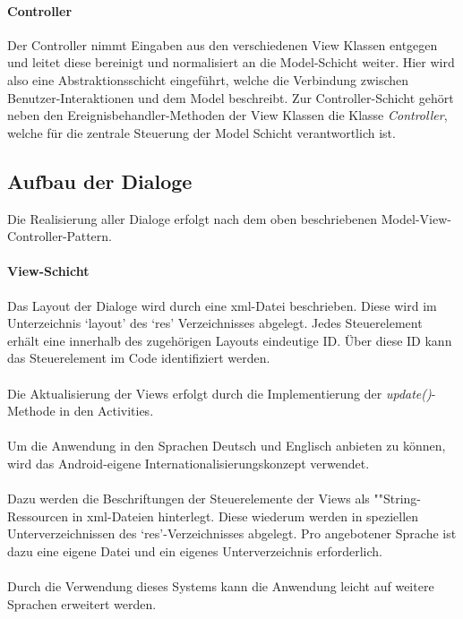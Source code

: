 \documentclass[10pt,a4paper]{article}
\begin{document}
  			\paragraph*{Controller}
  				Der Controller nimmt Eingaben aus den verschiedenen View Klassen entgegen und leitet diese bereinigt und normalisiert an die
  				Model-Schicht weiter. Hier wird also eine Abstraktionsschicht eingeführt, welche die Verbindung zwischen Benutzer-Interaktionen
  				und dem Model beschreibt. Zur Controller-Schicht gehört neben den Ereignisbehandler-Methoden der View Klassen die Klasse
  				\textit{Controller}, welche für die zentrale Steuerung der Model Schicht verantwortlich ist.  				
		\subsection{Aufbau der Dialoge}
  		\label{sec:aufbau_dialoge}
	Die Realisierung aller Dialoge erfolgt nach dem oben beschriebenen Model-View-Controller-Pattern.
	
		\paragraph*{View-Schicht} Das Layout der Dialoge wird durch eine xml-Datei beschrieben. Diese wird im Unterzeichnis `layout' des `res'
		Verzeichnisses abgelegt. Jedes Steuerelement erhält eine innerhalb des zugehörigen Layouts eindeutige ID. Über diese ID kann das Steuerelement
		im Code identifiziert werden. \\ \\
		Die Aktualisierung der Views erfolgt durch die Implementierung der \textit{update()}-Methode in den Activities. \\ \\
		Um die Anwendung in den Sprachen Deutsch und Englisch anbieten zu können, wird das Android-eigene Internationalisierungskonzept verwendet. \\ \\
		Dazu werden die Beschriftungen der Steuerelemente der Views als ""String-Res\-sour\-cen in xml-Dateien hinterlegt. Diese wiederum werden in
		speziellen Unterverzeichnissen des `res'-Verzeichnisses abgelegt. Pro angebotener Sprache ist dazu eine eigene Datei und ein eigenes
		Unterverzeichnis erforderlich. \\ \\
		Durch die Verwendung dieses Systems kann die Anwendung leicht auf weitere Sprachen erweitert werden.
	
\end{document}
